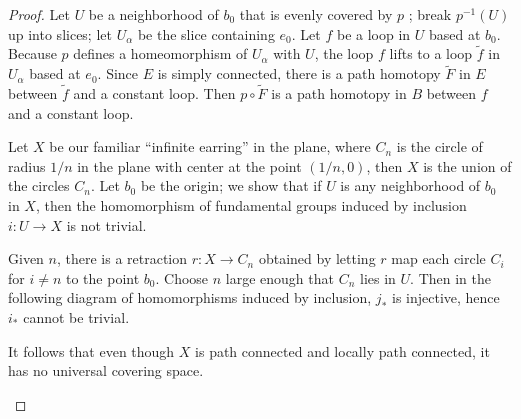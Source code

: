 \begin{proof}
	Let \(U\) be a neighborhood of \(b_{0}\) that is evenly covered by \(p\) ; break \(p^{-1}( U)\) up into slices; let \(U_{\alpha }\) be the slice containing \(e_{0}\). Let \(f\) be a loop in \(U\) based at \(b_{0}\). Because \(p\) defines a homeomorphism of \(U_{\alpha }\) with \(U\), the loop \(f\) lifts to a loop \(\widetilde{f}\) in \(U_{\alpha }\) based at \(e_{0}\). Since \(E\) is simply connected, there is a path homotopy \(\widetilde{F}\) in \(E\) between \(\widetilde{f}\) and a constant loop. Then \(p \circ \widetilde{F}\) is a path homotopy in \(B\) between \(f\) and a constant loop.
\begin{centeredblock}
\begin{example}
\label{ex:\thesection.\theexample}
	Let \(X\) be our familiar ``infinite earring'' in the plane, where \(C_{n}\) is the circle of radius \(1/n\) in the plane with center at the point \(( {1/n,0})\), then \(X\) is the union of the circles \(C_{n}\). Let \(b_{0}\) be the origin; we show that if \(U\) is any neighborhood of \(b_{0}\) in \(X\), then the homomorphism of fundamental groups induced by inclusion \(i : U \rightarrow X\) is not trivial.

Given \(n\), there is a retraction \(r : X \rightarrow {C}_{n}\) obtained by letting \(r\) map each circle \(C_{i}\) for \(i \neq n\) to the point \(b_{0}\). Choose \(n\) large enough that \(C_{n}\) lies in \(U\). Then in the following diagram of homomorphisms induced by inclusion, \(j_{ * }\) is injective, hence \(i_{ * }\) cannot be trivial.

\par\nopagebreak
\begin{center}
	\label{fig:com_80_5}
\end{center}
\par\nopagebreak

It follows that even though \(X\) is path connected and locally path connected, it has no universal covering space.
\end{example}
\end{centeredblock}
\end{proof}
